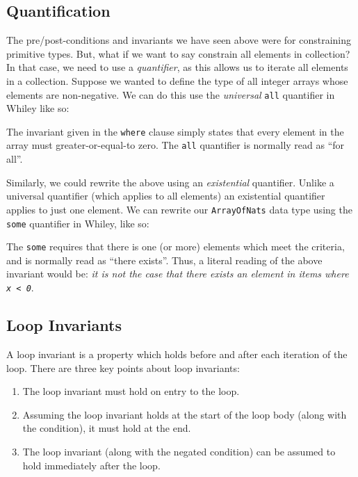 \subsection{Quantification}
The pre/post-conditions and invariants we have seen above were for constraining primitive types.  But, what if we want to say constrain all elements in collection?  In that case, we need to use a {\em quantifier}, as this allows us to iterate all elements in a collection.  Suppose we wanted to define the type of all integer arrays whose elements are non-negative.  We can do this use the {\em universal} \lstinline{all} quantifier in Whiley like so:



The invariant given in the \lstinline{where} clause simply states that every element in the array must greater-or-equal-to zero.  The \lstinline{all} quantifier is normally read as ``for all''.

Similarly, we could rewrite the above using an {\em existential} quantifier.  Unlike a universal quantifier (which applies to all elements) an existential quantifier applies to just one element.  We can rewrite our \lstinline{ArrayOfNats} data type using the \lstinline{some} quantifier in Whiley, like so:



The \lstinline{some} requires that there is one (or more) elements which meet the criteria, and is normally read as ``there exists''.  Thus, a literal reading of the above invariant would be: {\em it is not the case that there exists an element in items where \lstinline{x < 0}}.  

\subsection{Loop Invariants}
\label{loop_invariants}

A loop invariant is a property which
holds before and after each iteration of the loop.  There are three
key points about loop invariants:
\begin{enumerate}
\item The loop invariant must hold on entry to the loop.
\item Assuming the loop invariant holds at the start of the loop body
  (along with the condition), it must hold at the end.
\item The loop invariant (along with the negated condition) can be
  assumed to hold immediately after the loop.
\end{enumerate}


